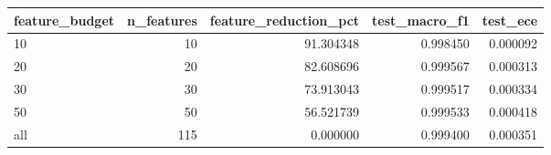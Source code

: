 \begin{tabular}{lrrrr}
\toprule
feature\_budget & n\_features & feature\_reduction\_pct & test\_macro\_f1 & test\_ece \\
\midrule
10 & 10 & 91.304348 & 0.998450 & 0.000092 \\
20 & 20 & 82.608696 & 0.999567 & 0.000313 \\
30 & 30 & 73.913043 & 0.999517 & 0.000334 \\
50 & 50 & 56.521739 & 0.999533 & 0.000418 \\
all & 115 & 0.000000 & 0.999400 & 0.000351 \\
\bottomrule
\end{tabular}
